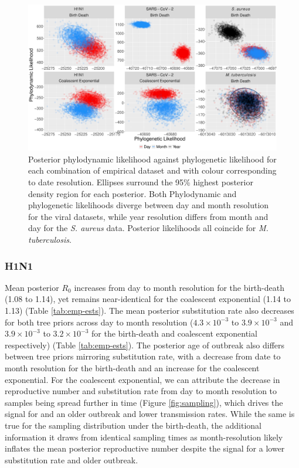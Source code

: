 \documentclass[12pt]{article}
\begin{document}
\begin{spacing}{2}
\begin{figure}[H]
    \centering
    \includegraphics[width=\textwidth]{figures/empirical_likelihood.pdf}
    \caption{Posterior phylodynamic likelihood against phylogenetic likelihood for each combination of empirical dataset and with colour corresponding to date resolution. Ellipses surround the 95\% highest posterior density region for each posterior. Both Phylodynamic and phylogenetic likelihoods diverge between day and month resolution for the viral datasets, while year resolution differs from month and day for the \textit{S. aureus} data. Posterior likelihoods all coincide for \textit{M. tuberculosis}. }
    \label{fig:emp-likelihood}
\end{figure}

\subsubsection*{H1N1}
Mean posterior $R_0$ increases from day to month resolution for the birth-death (1.08 to 1.14), yet remains near-identical for the coalescent exponential (1.14 to 1.13) (Table \ref{tab:emp-ests}). The mean posterior substitution rate also decreases for both tree priors across day to month resolution ($4.3\times10^{-3}$ to $3.9\times10^{-3}$ and $3.9\times10^{-3}$ to $3.2\times10^{-3}$ for the birth-death and coalescent exponential respectively) (Table \ref{tab:emp-ests}). The posterior age of outbreak also differs between tree priors mirroring substitution rate, with a decrease from date to month resolution for the birth-death and an increase for the coalescent exponential. For the coalescent exponential, we can attribute the decrease in reproductive number and substitution rate from day to month resolution to samples being spread further in time (Figure \ref{fig:sampling}), which drives the signal for and an older outbreak and lower transmission rates. While the same is true for the sampling distribution under the birth-death, the additional information it draws from identical sampling times as month-resolution likely inflates the mean posterior reproductive number despite the signal for a lower substitution rate and older outbreak.


\end{spacing}
\end{document}
